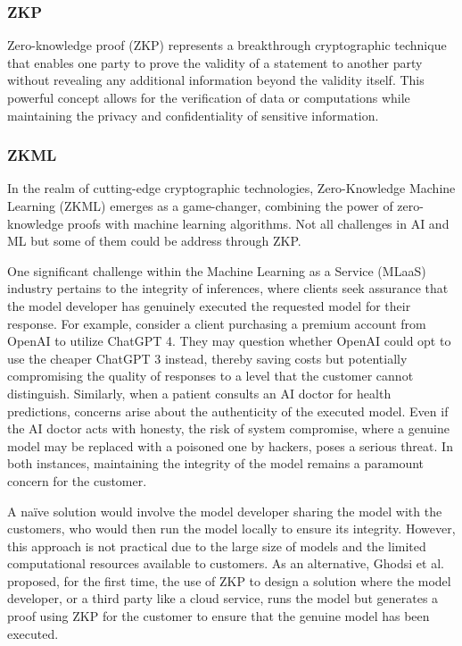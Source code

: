 \documentclass[conference]{IEEEtran}
\begin{document}
\subsubsection{ZKP}
Zero-knowledge proof (ZKP) represents a breakthrough cryptographic technique that enables one party to prove the validity of a statement to another party without revealing any additional information beyond the validity itself. This powerful concept allows for the verification of data or computations while maintaining the privacy and confidentiality of sensitive information.
\subsubsection{ZKML}

In the realm of cutting-edge cryptographic technologies, Zero-Knowledge Machine Learning (ZKML) emerges as a game-changer, combining the power of zero-knowledge proofs with machine learning algorithms. Not all challenges in AI and ML but some of them could be address through ZKP.

One significant challenge within the Machine Learning as a Service (MLaaS) industry pertains to the integrity of inferences, where clients seek assurance that the model developer has genuinely executed the requested model for their response. For example, consider a client purchasing a premium account from OpenAI to utilize ChatGPT 4. They may question whether OpenAI could opt to use the cheaper ChatGPT 3 instead, thereby saving costs but potentially compromising the quality of responses to a level that the customer cannot distinguish. Similarly, when a patient consults an AI doctor for health predictions, concerns arise about the authenticity of the executed model. Even if the AI doctor acts with honesty, the risk of system compromise, where a genuine model may be replaced with a poisoned one by hackers, poses a serious threat. In both instances, maintaining the integrity of the model remains a paramount concern for the customer.

A naïve solution would involve the model developer sharing the model with the customers, who would then run the model locally to ensure its integrity. However, this approach is not practical due to the large size of models and the limited computational resources available to customers. As an alternative, Ghodsi et al. \cite{Ghodsi2017SafetyNetsVE} proposed, for the first time, the use of ZKP to design a solution where the model developer, or a third party like a cloud service, runs the model but generates a proof using ZKP for the customer to ensure that the genuine model has been executed.
\end{document}
